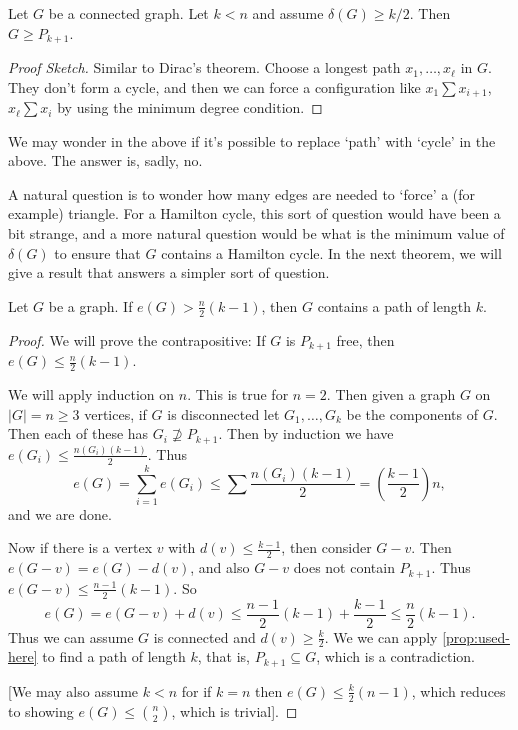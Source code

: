 \documentclass[a4paper]{scrartcl}
\begin{document}
\begin{proposition}\label{prop:used-here}
	Let $G$ be a connected graph. Let $k < n$ and assume $\delta(G) \geq k/2$. Then $G \geq P_{k + 1}$.
\end{proposition}
\begin{proof}[Proof Sketch]
	Similar to Dirac's theorem. Choose a longest path $x_1, \dots, x_\ell$ in $G$. They don't form a cycle, and then we can force a configuration like $x_1 \sum x_{i + 1}$, $x_{\ell} \sum x_i$ by using the minimum degree condition.
\end{proof}

We may wonder in the above if it's possible to replace `path' with `cycle' in the above. The answer is, sadly, no.

A natural question is to wonder how many edges are needed to `force' a (for example) triangle.
For a Hamilton cycle, this sort of question would have been a bit strange, and a more natural question would be what is the minimum value of $\delta(G)$ to ensure that $G$ contains a Hamilton cycle.
In the next theorem, we will give a result that answers a simpler sort of question.

\begin{theorem}
	Let $G$ be a graph. If $e(G) > \frac{n}{2}(k - 1)$, then $G$ contains a path of length $k$.
\end{theorem}
\begin{proof}
	We will prove the contrapositive: If $G$ is $P_{k + 1}$ free, then $e(G) \leq \frac{n}{2}(k - 1)$.

	We will apply induction on $n$. This is true for $n = 2$.
	Then given a graph $G$ on $|G| = n \geq 3$ vertices, if $G$ is disconnected let $G_1, \dots, G_k$ be the components of $G$. Then each of these has $G_i \not \supseteq P_{k + 1}$. Then by induction we have $e(G_i) \leq \frac{n(G_i)(k - 1)}{2}$. Thus
	$$
	e(G) = \sum_{i = 1}^k e(G_i) \leq \sum \frac{n(G_i)(k - 1)}{2} = \left(\frac{k - 1}{2}\right)n,
	$$
	and we are done.

	Now if there is a vertex $v$ with $d(v) \leq \frac{k - 1}{2}$, then consider $G - v$. Then $e(G - v) = e(G) - d(v)$, and also $G - v$ does not contain $P_{k + 1}$. Thus $e(G - v) \leq \frac{n - 1}{2}(k - 1)$. So
	$$
	e(G) = e(G - v) + d(v) \leq \frac{n - 1}{2}(k - 1) + \frac{k -1}{2} \leq \frac{n}{2}(k - 1).
	$$
	Thus we can assume $G$ is connected and $d(v)  \geq \frac{k}{2}$.
	We we can apply \autoref{prop:used-here} to find a path of length $k$, that is, $P_{k + 1} \subseteq G$, which is a contradiction.

	[We may also assume $k < n$ for if $k = n$ then $e(G) \leq \frac{k}{2}(n - 1)$, which reduces to showing $e(G) \leq \binom{n}{2}$, which is trivial].
\end{proof}
\end{document}
